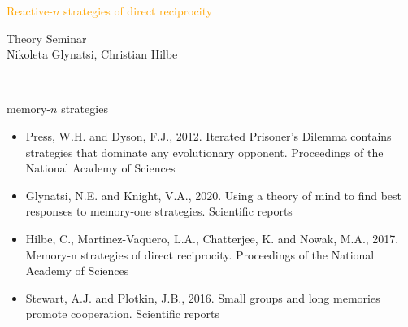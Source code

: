 \documentclass{beamer}
\begin{document}
\begin{frame}
    \begin{center}
        \Large{\textcolor{orange}{Reactive-\(n\) strategies of direct reciprocity}} \\
        \vspace{.5cm}

        \vspace{1cm}
        \normalsize{Theory Seminar} \\
        \vspace{.5cm}
        \normalsize{Nikoleta Glynatsi, Christian Hilbe}

    \end{center}
\end{frame}

\begin{frame}
    \centering
    
\end{frame}

\begin{frame}
    \begin{center}
         \\
        \vspace{1cm} \pause

        memory-\(n\) strategies
    \end{center}
\end{frame}

\begin{frame}
    \footnotesize{
    \begin{itemize}[<+->]
        \item Press, W.H. and Dyson, F.J., 2012. Iterated Prisoner's Dilemma contains strategies that dominate any evolutionary opponent. Proceedings of the National Academy of Sciences
        \item Glynatsi, N.E. and Knight, V.A., 2020. Using a theory of mind to find best responses to memory-one strategies. Scientific reports
        \item Hilbe, C., Martinez-Vaquero, L.A., Chatterjee, K. and Nowak, M.A., 2017. Memory-n strategies of direct reciprocity. Proceedings of the National Academy of Sciences
        \item Stewart, A.J. and Plotkin, J.B., 2016. Small groups and long memories promote cooperation. Scientific reports
    \end{itemize}}
\end{frame}
\end{document}
